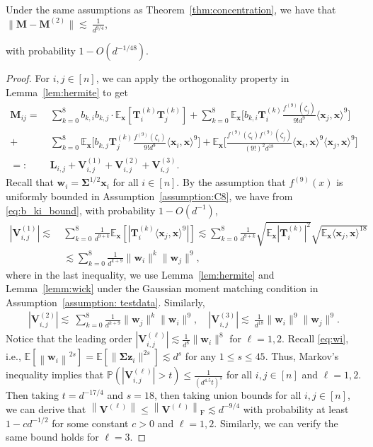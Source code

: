 \documentclass[twoside,11pt]{article}
\newcommand{\norm}[1]{\left\|#1\right\|}
\newcommand{\bw}{\boldsymbol{w}}
\renewcommand{\P}{\mathbb{P}}
\newcommand{\E}{\mathbb{E}}
\def\bL{{\boldsymbol L}}
\def\bT{{\boldsymbol T}}
\def\bM{{\boldsymbol M}}
\def\bw{{\boldsymbol w}}
\def\bx{{\boldsymbol x}}
\def\bz{{\boldsymbol z}}
\def\bSigma{{\boldsymbol \Sigma}}
\def\T{{\mathbb T}}
\def\T{{\mathbb T}}
\renewcommand{\T}{\boldsymbol{T}}
\newcommand{\V}{\boldsymbol{V}}
\renewcommand{\P}{\mathbb{P}}
\newcommand{\1}{\mathbf{1}}
\begin{document}
\begin{lemma}\label{lemma:diff_M_v}
Under the same assumptions as Theorem~\ref{thm:concentration}, we have that
    $
        \|{\bM-\bM^{(2)}}\| \lesssim ~ \frac{1}{d^{9/4}}$,

with probability $1-O(d^{-1/48})$.
\end{lemma}
\begin{proof}
For $i,j\in[n]$, we can apply the orthogonality property in Lemma~\ref{lem:hermite} to get
\begin{align*}
\bM_{ij}=~&\sum_{k=0}^{8}b_{k,i }b_{k,j}\cdot \E_{\bx}[\T_i^{(k)}\T_j^{(k)}] 
 +\sum_{k=0}^{8}\E_{\bx}\Big[b_{k,i} \T_i^{(k)}\frac{f^{(9)}(\zeta_{j})}{9!d^9}\langle \bx_j,\bx \rangle^9\Big]  \\
 + &\sum_{k=0}^8 \E_{\bx} \big[ b_{k,j}\T_j^{(k)}\frac{f^{(9)}(\zeta_{i})}{9!d^9}\langle \bx_i,\bx \rangle^9 \Big] 
+\E_{\bx}\Big[ \frac{f^{(9)}(\zeta_{i})f^{(9)}(\zeta_{j})}{(9!)^2d^{18}} \langle \bx_i,\bx \rangle^9  \langle \bx_j,\bx \rangle^9  \Big]\\
=:~&  \bL_{i,j}+\V_{i,j}^{(1)}+\V_{i,j}^{(2)}+\V_{i,j}^{(3)}.
\end{align*}
Recall that $\bw_i=\bSigma^{1/2}\bx_i$ for all $i\in[n]$. By the assumption that $f^{(9)}(x)$ is uniformly bounded in Assumption~\ref{assumption:C8}, we have from \eqref{eq:b_ki_bound}, with probability  $1-O(d^{-1})$,
\begin{align}
    |\V_{i,j}^{(1)}|\lesssim~& \sum_{k=0}^8 \frac{1}{d^{9+k}}\E_{\bx}[|\bT_{i}^{(k)}
    \langle \bx_j,\bx\rangle ^9|]\lesssim \sum_{k=0}^8 \frac{1}{d^{9+k}}\sqrt{\E_{\bx}|\bT_{i}^{(k)}|^2}
    \sqrt{\E_{\bx}\langle \bx_j,\bx\rangle ^{18}}\\
    &\lesssim\sum_{k=0}^8\frac{1}{d^{k+9}}\|\bw_i\|^k\|\bw_j\|^9,
\end{align}
where in the last inequality, we use Lemma~\ref{lem:hermite} and Lemma~\ref{lemm:wick} under the Gaussian moment matching condition in Assumption~\ref{assumption: testdata}. 
Similarly, 
\begin{align}
  |\V_{i,j}^{(2)}|\lesssim~ \sum_{k=0}^8\frac{1}{d^{k+9}}\|\bw_j\|^k\|\bw_i\|^9, \quad 
    |\V_{i,j}^{(3)}|\lesssim~  \frac{1}{d^{18}}\|\bw_i\|^9\|\bw_j\|^9.
\end{align}
Notice that  the leading order $|\V_{i,j}^{(\ell)}|\lesssim \frac{1}{d^8}\|\bw_i\|^8$ for $\ell=1,2$. Recall \eqref{eq:wi}, i.e., $\E\left[\norm{\bw_i}^{2s}\right] =\E [\| \bSigma \bz_i\|^{2s}]\lesssim  d^{s}$ for any $1\le s\le 45$. Thus,  Markov's inequality implies that
$\P(|\V_{i,j}^{(\ell)}|>t)\le \frac{1}{(d^{4.5}t)^s}$
for all $i,j\in [n]$ and $\ell=1,2$. Then taking $t=d^{-17/4}$ and $s=18$, then taking union bounds for all $i,j\in [n]$, we can derive that $\norm{\V^{(\ell)}}\le \norm{\V^{(\ell)}}_{\mathrm{F}}\lesssim d^{-9/4}$ with probability at least $1-cd^{-1/2}$ for some constant $c>0$ and $\ell =1,2$. Similarly, we can verify the same bound holds for $\ell=3$.



\end{proof}
\end{document}
